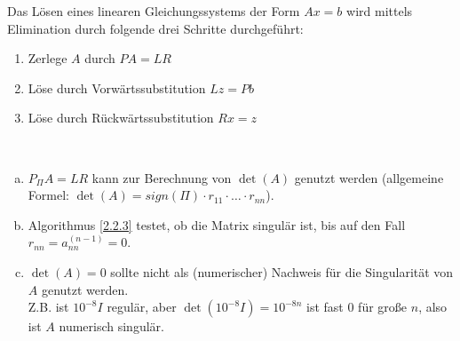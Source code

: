 Das Lösen eines linearen Gleichungssystems der Form $Ax=b$ wird mittels
Elimination durch folgende drei Schritte durchgeführt:
\begin{enumerate}[1)]
\item Zerlege $A$ durch $PA=LR$
\item Löse durch Vorwärtssubstitution $Lz=Pb$
\item Löse durch Rückwärtssubstitution $Rx=z$
\end{enumerate}

\begin{Beme}~
  \begin{enumerate}[a)]
  \item $P_\Pi A=LR$ kann zur Berechnung von $\det(A)$ genutzt werden
    (allgemeine Formel: $\det(A)=sign(\Pi)\cdot r_{11}\cdot \dots \cdot r_{nn}$).
  \item Algorithmus \ref{2.2.3}  testet, ob die Matrix singulär ist,
    bis auf den Fall $r_{nn}=a_{nn}^{(n-1)}=0$.
  \item $\det(A)=0$ sollte nicht als (numerischer) Nachweis für die
    Singularität von $A$ genutzt werden.\\
    Z.B. ist $10^{-8}I$ regulär, aber $\det(10^{-8}I) = 10^{-8n}$ ist fast 0
    für große $n$, also ist $A$ numerisch singulär.
  \end{enumerate}
\end{Beme}

